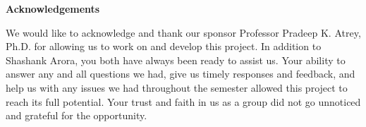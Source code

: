 \documentclass[12pt]{article}
\begin{document}
\clearpage\thispagestyle{empty}

	\vspace{1cm}
		\begin{center}
\textbf{Acknowledgements}
		\end{center}
	\vspace{1cm}
{\normalsize We would like to acknowledge and thank our sponsor Professor Pradeep K. Atrey, Ph.D. for allowing us to work on and develop this project. In addition to Shashank Arora, you both have always been ready to assist us. Your ability to answer any and all questions we had, give us timely responses and feedback, and help us with any issues we had throughout the semester allowed this project to reach its full potential. Your trust and faith in us as a group did not go unnoticed and grateful for the opportunity. 



\par}

\clearpage\thispagestyle{empty}
\end{document}
